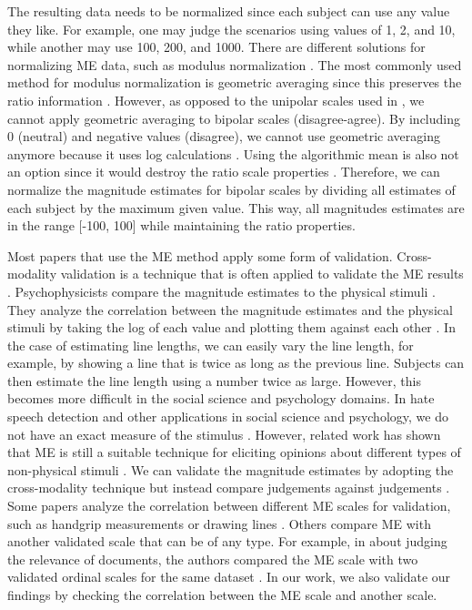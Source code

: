 %
The resulting data needs to be normalized since each subject can use any value they like.
%
For example, one may judge the scenarios using values of 1, 2, and 10, while another may use 100, 200, and 1000.
%
There are different solutions for normalizing ME data, such as modulus normalization \cite{moskowitz1977magnitude}.
%
The most commonly used method for modulus normalization is geometric averaging since this preserves the ratio information \cite{moskowitz1977magnitude, mcgee2004master}.
%
However, as opposed to the unipolar scales used in \cite{bard1996magnitude, mcgee2004master}, we cannot apply geometric averaging to bipolar scales (disagree-agree).
%
By including 0 (neutral) and negative values (disagree), we cannot use geometric averaging anymore because it uses log calculations \cite{moskowitz1977magnitude}.
%
Using the algorithmic mean is also not an option since it would destroy the ratio scale properties \cite{moskowitz1977magnitude}.
%
Therefore, we can normalize the magnitude estimates for bipolar scales by dividing all estimates of each subject by the maximum given value.
%
This way, all magnitudes estimates are in the range [-100, 100] while maintaining the ratio properties.
%

%
Most papers that use the ME method apply some form of validation. Cross-modality validation is a technique that is often applied to validate the ME results \cite{bard1996magnitude}.
%
Psychophysicists compare the magnitude estimates to the physical stimuli \cite{bard1996magnitude}.
%
They analyze the correlation between the magnitude estimates and the physical stimuli by taking the log of each value and plotting them against each other \cite{bard1996magnitude}.
%
In the case of estimating line lengths, we can easily vary the line length, for example, by showing a line that is twice as long as the previous line. Subjects can then estimate the line length using a number twice as large.
%
However, this becomes more difficult in the social science and psychology domains.
%
In hate speech detection and other applications in social science and psychology, we do not have an exact measure of the stimulus \cite{bard1996magnitude}.
%
However, related work has shown that ME is still a suitable technique for eliciting opinions about different types of non-physical stimuli \cite{bard1996magnitude, mcgee2004master, maddalena2017crowdsourcing, lodge1979comparisons}.
%
We can validate the magnitude estimates by adopting the cross-modality technique but instead compare judgements against judgements \cite{bard1996magnitude, lodge1979comparisons}.
%
Some papers analyze the correlation between different ME scales for validation, such as handgrip measurements or drawing lines \cite{bard1996magnitude, lodge1976calibration}.
%
Others compare ME with another validated scale that can be of any type.
%
For example, in \cite{maddalena2017crowdsourcing} about judging the relevance of documents, the authors compared the ME scale with two validated ordinal scales for the same dataset \cite{maddalena2017crowdsourcing}.
%
In our work, we also validate our findings by checking the correlation between the ME scale and another scale.
%

